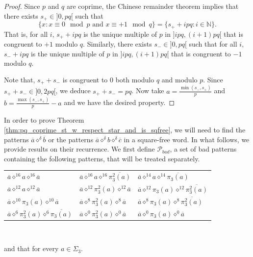 \documentclass[12pt]{article}
\theoremstyle{definition}
\newcommand{\patternprime}[3]{{#1}\diamond^{#2}{#3}}
\begin{document}
\begin{proof}
Since $p$ and $q$ are coprime, the Chinese remainder theorem implies that there exists $s_+\in ]0,pq[$ such that 
\[ 
\{x: x\equiv 0\mod p \text{ and } x\equiv +1\mod q \}=\{s_++ipq: i\in \mathbb{N}\}.
\]
That is, for all $i$, $s_++ipq$ is the unique multiple of $p$ in $]ipq, (i + 1)pq[$ that is congruent to $+1$ modulo $q$. Similarly, there exists $s_-\in ]0,pq[$ such that  for all $i$, $s_-+ipq$ is the unique multiple of $p$ in $]ipq, (i + 1)pq[$ that is congruent to $-1$ modulo $q$. 

Note that, $s_++s_-$ is congruent to $0$ both modulo $q$ and modulo $p$. Since $s_++s_-\in ]0,2pq[$, we deduce $s_++s_-=pq$.
Now take $a=\frac{\min(s_-, s_+)}{p}$ and $b= \frac{\max(s_-, s_+)}{p}-a$ and we have the desired property.
\end{proof}

In order to prove Theorem \ref{thm:pq_coprime_st_w_respect_star_and_is_sqfree}, we will need to find the patterns $\patternprime{\overline{a}}{\delta}{\overline{b}}$ or the patterns $\patternprime{\overline{a}}{\delta}{b}\patternprime{}{\delta}{\overline{c}}$ in a square-free word. In what follows, we provide results on their recurrence. We first define $\mathcal{P}_{bad}$, a set of bad patterns containing the following patterns,  that will be treated separately.\\
\begin{center}
\begin{tabular}{lll}
$\patternprime{\overline{a}}{16}{a}\patternprime{}{16}{\overline{a}}$ &$\patternprime{\overline{a}}{16}{a}\patternprime{}{16}{\overline{\pi_3^2(a)}}$
&$\patternprime{\overline{a}}{14}{a}\patternprime{}{14}{\overline{\pi_3(a)}}$ \\
$\patternprime{\overline{a}}{12}{a}\patternprime{}{12}{\overline{a}}$ 
&$\patternprime{\overline{a}}{12}{\pi_3^2(a)}\patternprime{}{12}{\overline{a}}$ 
&$\patternprime{\overline{a}}{12}{\pi_3(a)}\patternprime{}{12}{\overline{\pi_3^2(a)}}$ \\
$\patternprime{\overline{a}}{10}{\pi_3(a)}\patternprime{}{10}{\overline{a}}$ 
&$\patternprime{\overline{a}}{8}{\pi_3^2(a)}\patternprime{}{8}{\overline{a}}$
&$\patternprime{\overline{a}}{8}{\pi_3(a)}\patternprime{}{8}{\overline{\pi_3^2(a)}}$ \\
$\patternprime{\overline{a}}{6}{\pi_3^2(a)}\patternprime{}{6}{\overline{\pi_3(a)}}$ 
&$\patternprime{\overline{a}}{0}{\pi_3^2(a)}\patternprime{}{0}{\overline{a}}$ 
&$\patternprime{\overline{a}}{0}{\pi_3(a)}\patternprime{}{0}{\overline{a}}$ \\
\end{tabular} \\
\end{center}
and that for every  $a \in \Sigma_3$.
\end{document}
